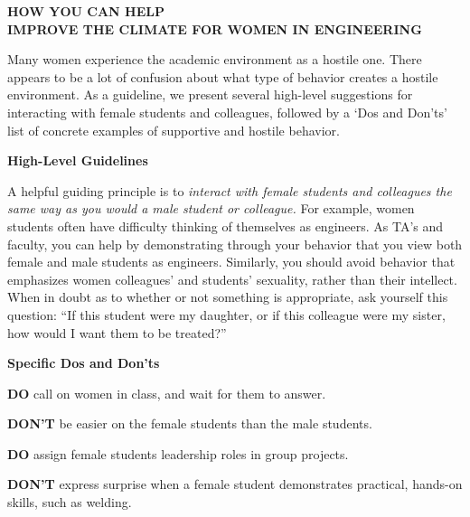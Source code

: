 \newpage

\begin{center}

{\bf HOW YOU CAN HELP\\
 IMPROVE THE CLIMATE FOR WOMEN  IN ENGINEERING}


\end{center}


Many women experience the academic environment as a hostile one. There
appears to be a lot of confusion about what type of behavior creates a
hostile environment. As a guideline, we present several high-level
suggestions for interacting with female students and colleagues,
followed by a `Dos and Don'ts' list of 
 concrete examples of supportive and  hostile behavior.


\bigskip

\noindent
{\bf High-Level Guidelines}

\medskip

A helpful
guiding principle is to {\em
interact with female students and colleagues
the same way as you would a male student or colleague.}
For example,
women students often have difficulty thinking
of themselves as engineers.
As TA's and faculty, you can help by demonstrating through your behavior
that you view both female and male students as engineers.
Similarly, you should avoid  behavior that emphasizes
women colleagues' and students' sexuality, rather than their intellect.  
When in doubt as to whether or not something is appropriate, ask yourself
this question: ``If this student were my daughter, or if this 
colleague were
my sister, how would I want them to be treated?''  



\bigskip

\noindent
{\bf Specific Dos and Don'ts}


\medskip

 
\noindent
{\bf DO} call on women in class, and wait for them to answer.

\smallskip

\noindent
{\bf DON'T} be easier on the female students than the male students.
 

\bigskip

\noindent
{\bf DO} assign female students leadership roles in group projects.

\smallskip

\noindent
{\bf DON'T} express surprise when a female student demonstrates practical,
hands-on skills, such as welding. 



